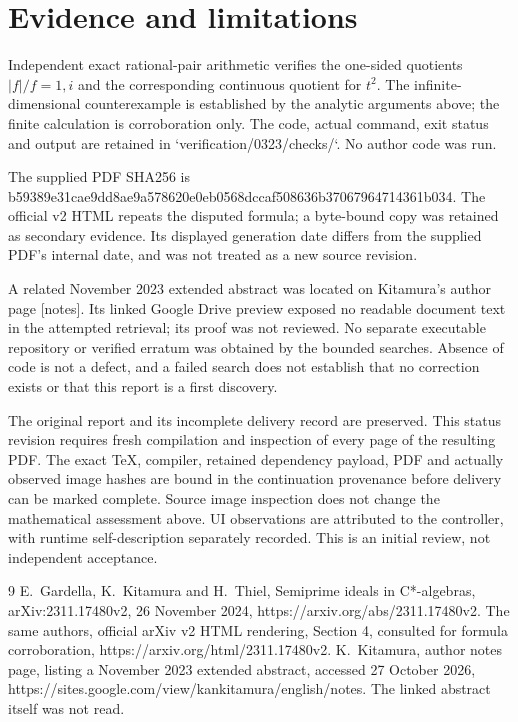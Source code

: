 \documentclass[10pt]{article}
\begin{document}
\section*{Evidence and limitations}
Independent exact rational-pair arithmetic verifies the one-sided quotients \(|f|/f=1,i\) and the corresponding continuous quotient for \(t^2\). The infinite-dimensional counterexample is established by the analytic arguments above; the finite calculation is corroboration only. The code, actual command, exit status and output are retained in `verification/0323/checks/`. No author code was run.\par
The supplied PDF SHA256 is b59389e31cae9dd8ae9a578620e0eb0568dccaf508636b37067964714361b034. The official v2 HTML repeats the disputed formula; a byte-bound copy was retained as secondary evidence. Its displayed generation date differs from the supplied PDF’s internal date, and was not treated as a new source revision.\par
A related November 2023 extended abstract was located on Kitamura’s author page [notes]. Its linked Google Drive preview exposed no readable document text in the attempted retrieval; its proof was not reviewed. No separate executable repository or verified erratum was obtained by the bounded searches. Absence of code is not a defect, and a failed search does not establish that no correction exists or that this report is a first discovery.\par
The original report and its incomplete delivery record are preserved. This status revision requires fresh compilation and inspection of every page of the resulting PDF. The exact TeX, compiler, retained dependency payload, PDF and actually observed image hashes are bound in the continuation provenance before delivery can be marked complete. Source image inspection does not change the mathematical assessment above. UI observations are attributed to the controller, with runtime self-description separately recorded. This is an initial review, not independent acceptance.\par
9 E. Gardella, K. Kitamura and H. Thiel, Semiprime ideals in C*-algebras, arXiv:2311.17480v2, 26 November 2024, https://arxiv.org/abs/2311.17480v2. The same authors, official arXiv v2 HTML rendering, Section 4, consulted for formula corroboration, https://arxiv.org/html/2311.17480v2. K. Kitamura, author notes page, listing a November 2023 extended abstract, accessed 27 October 2026, https://sites.google.com/view/kankitamura/english/notes. The linked abstract itself was not read.\par
\end{document}
